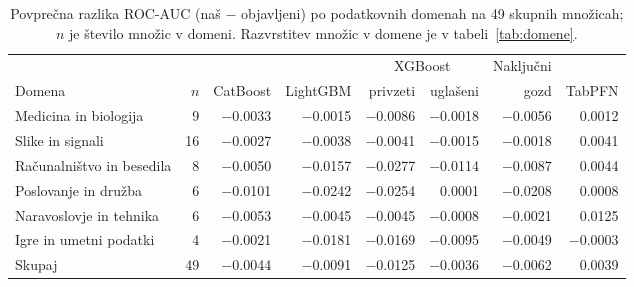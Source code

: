 \begin{table}[htbp]
\centering
\caption{Povprečna razlika ROC-AUC (naš $-$ objavljeni) po podatkovnih domenah na 49 skupnih množicah; $n$ je število množic v domeni. Razvrstitev množic v domene je v tabeli~\ref{tab:domene}.}
\label{tab:literatura-domene}
\footnotesize
\setlength{\tabcolsep}{3pt}
\begin{tabular}{>{\raggedright\arraybackslash}p{2.5cm}rrrrrrr}
\hline
 & & & & \multicolumn{2}{c}{XGBoost} & Naključni & \\
Domena & $n$ & CatBoost & LightGBM & privzeti & uglašeni & gozd & TabPFN \\
\hline
Medicina in biologija & 9 & \num[retain-explicit-plus]{-0.0033} & \num[retain-explicit-plus]{-0.0015} & \num[retain-explicit-plus]{-0.0086} & \num[retain-explicit-plus]{-0.0018} & \num[retain-explicit-plus]{-0.0056} & \num[retain-explicit-plus]{+0.0012} \\
Slike in signali & 16 & \num[retain-explicit-plus]{-0.0027} & \num[retain-explicit-plus]{-0.0038} & \num[retain-explicit-plus]{-0.0041} & \num[retain-explicit-plus]{-0.0015} & \num[retain-explicit-plus]{-0.0018} & \num[retain-explicit-plus]{+0.0041} \\
Računalništvo in besedila & 8 & \num[retain-explicit-plus]{-0.0050} & \num[retain-explicit-plus]{-0.0157} & \num[retain-explicit-plus]{-0.0277} & \num[retain-explicit-plus]{-0.0114} & \num[retain-explicit-plus]{-0.0087} & \num[retain-explicit-plus]{+0.0044} \\
Poslovanje in družba & 6 & \num[retain-explicit-plus]{-0.0101} & \num[retain-explicit-plus]{-0.0242} & \num[retain-explicit-plus]{-0.0254} & \num[retain-explicit-plus]{+0.0001} & \num[retain-explicit-plus]{-0.0208} & \num[retain-explicit-plus]{+0.0008} \\
Naravoslovje in tehnika & 6 & \num[retain-explicit-plus]{-0.0053} & \num[retain-explicit-plus]{-0.0045} & \num[retain-explicit-plus]{-0.0045} & \num[retain-explicit-plus]{-0.0008} & \num[retain-explicit-plus]{-0.0021} & \num[retain-explicit-plus]{+0.0125} \\
Igre in umetni podatki & 4 & \num[retain-explicit-plus]{-0.0021} & \num[retain-explicit-plus]{-0.0181} & \num[retain-explicit-plus]{-0.0169} & \num[retain-explicit-plus]{-0.0095} & \num[retain-explicit-plus]{-0.0049} & \num[retain-explicit-plus]{-0.0003} \\
\hline
Skupaj & 49 & \num[retain-explicit-plus]{-0.0044} & \num[retain-explicit-plus]{-0.0091} & \num[retain-explicit-plus]{-0.0125} & \num[retain-explicit-plus]{-0.0036} & \num[retain-explicit-plus]{-0.0062} & \num[retain-explicit-plus]{+0.0039} \\
\hline
\end{tabular}
\end{table}
